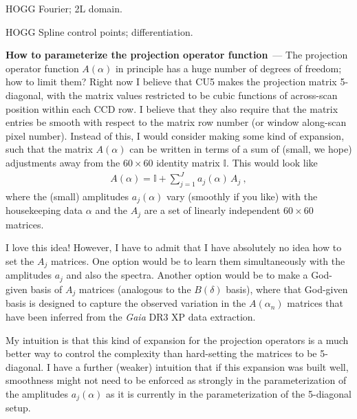 \documentclass[11pt]{article}
\renewcommand{\paragraph}[1]{\medskip\par\noindent\textbf{#1}~---}
\begin{document}
HOGG Fourier; 2L domain.

HOGG Spline control points; differentiation.

\paragraph{How to parameterize the projection operator function}
The projection operator function $A(\alpha)$ in principle has a huge number of degrees of freedom; how to limit them?
Right now I believe that CU5 makes the projection matrix 5-diagonal, with the matrix values restricted to be cubic functions of across-scan position within each CCD row.
I believe that they also require that the matrix entries be smooth with respect to the matrix row number (or window along-scan pixel number).
Instead of this, I would consider making some kind of expansion, such that the matrix $A(\alpha)$ can be written in terms of a sum of (small, we hope) adjustments away from the $60\times 60$ identity matrix $\mathbb{I}$.
This would look like
\begin{align}
    A(\alpha) = \mathbb{I} + \sum_{j=1}^J a_j(\alpha)\,A_j~,
\end{align}
where the (small) amplitudes $a_j(\alpha)$ vary (smoothly if you like) with the housekeeping data $\alpha$ and the $A_j$ are a set of linearly independent $60\times 60$ matrices.

I love this idea!
However, I have to admit that I have absolutely no idea how to set the $A_j$ matrices.
One option would be to learn them simultaneously with the amplitudes $a_j$ and also the spectra.
Another option would be to make a God-given basis of $A_j$ matrices (analogous to the $B(\delta)$ basis), where that God-given basis is designed to capture the observed variation in the $A(\alpha_n)$ matrices that have been inferred from the \textsl{Gaia} DR3 XP data extraction.

My intuition is that this kind of expansion for the projection operators is a much better way to control the complexity than hard-setting the matrices to be 5-diagonal.
I have a further (weaker) intuition that if this expansion was built well, smoothness might not need to be enforced as strongly in the parameterization of the amplitudes $a_j(\alpha)$ as it is currently in the parameterization of the 5-diagonal setup.
\end{document}
